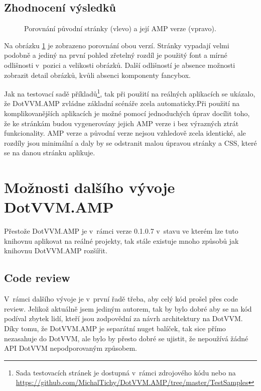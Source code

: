 \section{Zhodnocení výsledků}

\begin{figure}[!h]
	\caption{Porovnání původní stránky (vlevo) a její AMP verze (vpravo).}
	\label{originalVSamp}
\end{figure}

Na obrázku \ref{originalVSamp} je zobrazeno porovnání obou verzí. Stránky vypadají velmi podobně a jediný na první pohled zřetelný rozdíl je použitý font a mírné odlišnosti v~pozici a velikosti obrázků. Další odlišností je absence možnosti zobrazit detail obrázků, kvůli absenci komponenty fancybox.

Jak na testovací sadě příkladů\footnote{ Sada testovacích stránek je dostupná v~rámci zdrojového kódu nebo na \url{https://github.com/MichalTichy/DotVVM.AMP/tree/master/TestSamples}}, tak při použití na reálných aplikacích se ukázalo, že DotVVM.AMP zvládne základní scénáře zcela automaticky.Při použití na komplikovanějších aplikacích je možné pomocí jednoduchých úprav docílit toho, že ke stránkám budou vygenerovány jejich AMP verze i bez výrazných ztrát funkcionality. AMP verze a původní verze nejsou vzhledově zcela identické, ale rozdíly jsou minimální a daly by se odstranit malou úpravou stránky a CSS, které se na danou stránku aplikuje.

\chapter{Možnosti dalšího vývoje DotVVM.AMP}
Přestože DotVVM.AMP je v~rámci verze 0.1.0.7 v~stavu ve kterém lze tuto knihovnu aplikovat na reálné projekty, tak stále existuje mnoho způsobů jak knihovnu DotVVM.AMP rozšířit.

\section{Code review}
V~rámci dalšího vývoje je v~první řadě třeba, aby celý kód prošel přes code review. Jelikož aktuálně jsem jediným autorem, tak by bylo dobré aby se na kód podíval zbytek lidí, kteří jsou zodpovědní za návrh architektury na DotVVM. Díky tomu, že DotVVM.AMP je separátní nuget balíček, tak sice přímo nezasahuje do DotVVM, ale bylo by přesto dobré se ujistit, že nepoužívá žádné API DotVVM nepodporovaným způsobem.

